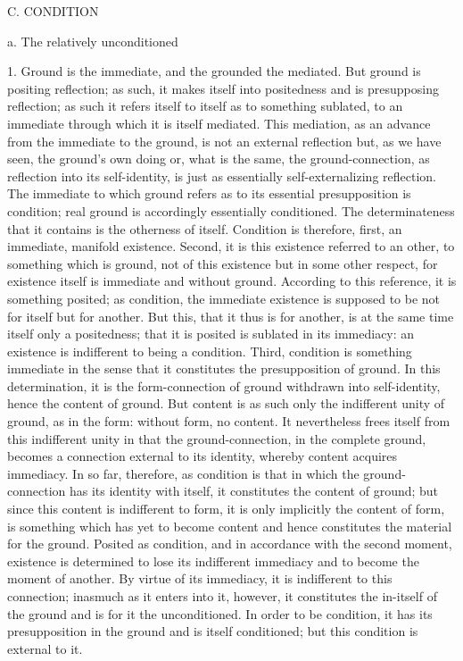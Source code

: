 C. CONDITION

a. The relatively unconditioned

1. Ground is the immediate, and the grounded the mediated.
But ground is positing reflection;
as such, it makes itself into positedness
and is presupposing reflection;
as such it refers itself to itself as to something sublated,
to an immediate through which it is itself mediated.
This mediation, as an advance from the immediate to the ground,
is not an external reflection
but, as we have seen, the ground's own doing
or, what is the same, the ground-connection,
as reflection into its self-identity,
is just as essentially
self-externalizing reflection.
The immediate to which ground refers as to
its essential presupposition is condition;
real ground is accordingly essentially conditioned.
The determinateness that it contains is the otherness of itself.
Condition is therefore, first, an immediate, manifold existence.
Second, it is this existence referred to an other,
to something which is ground, not
of this existence but in some other respect,
for existence itself is immediate and without ground.
According to this reference, it is something posited;
as condition, the immediate existence is supposed to be
not for itself but for another.
But this, that it thus is for another, is at the same time
itself only a positedness;
that it is posited is sublated in its immediacy:
an existence is indifferent to being a condition.
Third, condition is something immediate in the sense
that it constitutes the presupposition of ground.
In this determination, it is the form-connection of ground
withdrawn into self-identity, hence the content of ground.
But content is as such only
the indifferent unity of ground, as in the form:
without form, no content.
It nevertheless frees itself from this
indifferent unity in that the ground-connection,
in the complete ground,
becomes a connection external to its identity,
whereby content acquires immediacy.
In so far, therefore, as condition is
that in which the ground-connection has
its identity with itself,
it constitutes the content of ground;
but since this content is indifferent to form,
it is only implicitly the content of form,
is something which has yet to become content
and hence constitutes the material for the ground.
Posited as condition, and in accordance with the second moment,
existence is determined to lose its indifferent immediacy
and to become the moment of another.
By virtue of its immediacy, it is indifferent to this connection;
inasmuch as it enters into it, however,
it constitutes the in-itself of the ground
and is for it the unconditioned.
In order to be condition, it has its presupposition in the ground
and is itself conditioned;
but this condition is external to it.

